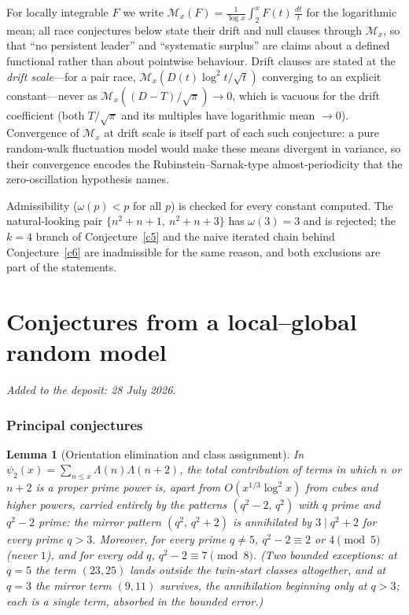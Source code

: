 \documentclass[11pt]{article}
\newtheorem{lemma}{Lemma}
\theoremstyle{definition}
\newcommand{\M}{\mathcal M}
\begin{document}
For locally integrable $F$ we write
$\M_x(F)=\frac1{\log x}\int_2^x F(t)\,\frac{dt}t$ for the logarithmic
mean; all race conjectures below state their drift and null clauses
through $\M_x$, so that ``no persistent leader'' and ``systematic
surplus'' are claims about a defined functional rather than about
pointwise behaviour.  Drift clauses are stated at the \emph{drift
scale}---for a pair race, $\M_x(D(t)\log^2t/\sqrt t)$ converging to
an explicit constant---never as
$\M_x((D-T)/\sqrt\pi)\to0$, which is vacuous for the drift coefficient
(both $T/\sqrt\pi$ and its multiples have logarithmic mean $\to0$).
Convergence of $\M_x$ at
drift scale is itself part of each such conjecture: a pure
random-walk fluctuation model would make these means divergent in
variance, so their convergence encodes the Rubinstein--Sarnak-type
almost-periodicity that the zero-oscillation hypothesis names.

Admissibility ($\omega(p)<p$ for all $p$) is checked for every constant
computed.  The natural-looking pair $\{n^2+n+1,\ n^2+n+3\}$ has
$\omega(3)=3$ and is
rejected; the $k=4$ branch of Conjecture~\ref{c5} and the naive
iterated chain behind Conjecture~\ref{c6} are inadmissible for the
same reason, and both exclusions are part of the statements.


\part{Conjectures from a local--global random model}

\medskip\noindent\emph{Added to the deposit: 28 July 2026.}\par\medskip

\section{Principal conjectures}

\begin{lemma}[Orientation elimination and class assignment]\label{l:c21}
In $\psi_2(x)=\sum_{n\le x}\Lambda(n)\Lambda(n+2)$, the total
contribution of terms in which $n$ or $n+2$ is a proper prime power
is, apart from $O(x^{1/3}\log^2 x)$ from cubes and higher powers,
carried entirely by the patterns $(q^2-2,\,q^2)$ with $q$ prime and
$q^2-2$ prime: the mirror pattern $(q^2,\,q^2+2)$ is annihilated by
$3\mid q^2+2$ for every prime $q>3$.  Moreover, for every prime
$q\neq5$, $q^2-2\equiv2$ or $4\pmod 5$ (never $1$), and for every odd
$q$, $q^2-2\equiv7\pmod8$.  (Two bounded exceptions: at $q=5$ the term $(23,25)$ lands outside the twin-start classes altogether, and at $q=3$ the mirror term $(9,11)$ survives, the annihilation beginning only at $q>3$; each is a single term, absorbed in the bounded error.)
\end{lemma}
\end{document}
